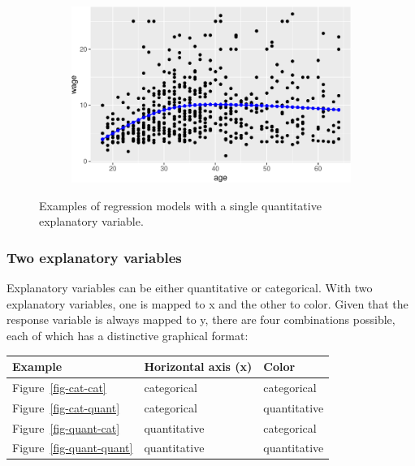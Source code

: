 \documentclass[
  letterpaper,
  DIV=11,
  numbers=noendperiod,
  oneside]{scrartcl}
\begin{document}
\begin{figure}
{\begin{figure}[H]
\begin{minipage}{0.33\linewidth}
\includegraphics{test-tufte_files/figure-pdf/unnamed-chunk-122-3.pdf}

\end{minipage}%

\end{figure}%

}

\caption{\label{fig-single-quant}Examples of regression models with a
single quantitative explanatory variable.}

\end{figure}%

\subsubsection{Two explanatory
variables}\label{sec-two-explanatory-variables}

Explanatory variables can be either quantitative or categorical. With
two explanatory variables, one is mapped to x and the other to color.
Given that the response variable is always mapped to y, there are four
combinations possible, each of which has a distinctive graphical format:

\begin{longtable}[]{@{}lll@{}}
\toprule\noalign{}
Example & Horizontal axis (x) & Color \\
\midrule\noalign{}
\endhead
\bottomrule\noalign{}
\endlastfoot
Figure~\ref{fig-cat-cat} & categorical & categorical \\
Figure~\ref{fig-cat-quant} & categorical & quantitative \\
Figure~\ref{fig-quant-cat} & quantitative & categorical \\
Figure~\ref{fig-quant-quant} & quantitative & quantitative \\
\end{longtable}
\end{document}
